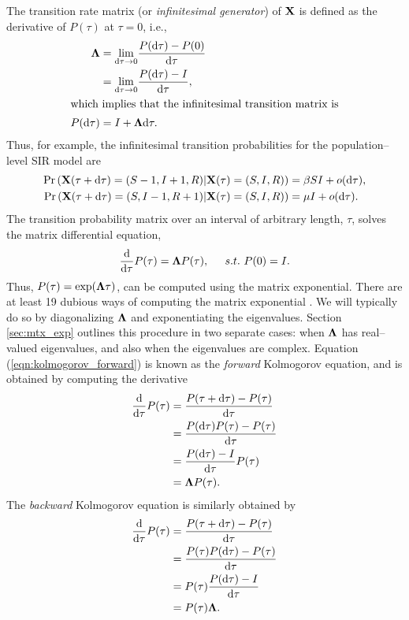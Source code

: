 The transition rate matrix (or \textit{infinitesimal generator}) of $ \mathbf{X} $ is defined as the derivative of $ P(\tau) $ at $ \tau = 0 $, i.e.,
\begin{align*}
\label{eqn:ctmc_generator}
\boldsymbol{\Lambda} &= \underset{\mathrm{d}\tau \rightarrow 0}{\lim}\frac{P(\mathrm{d}\tau) - P(0)}{\mathrm{d}\tau} \\
&= \underset{\mathrm{d}\tau \rightarrow 0}{\lim}\frac{P(\mathrm{d}\tau) - I}{\mathrm{d}\tau}, \\
\shortintertext{which implies that the infinitesimal transition matrix is} P(\mathrm{d}\tau) &= I + \boldsymbol{\Lambda}\mathrm{d}\tau.
\end{align*}
Thus, for example, the infinitesimal transition probabilities for the population--level SIR model are
\begin{align*}
\Pr\left (\mathbf{X}(\tau+\mathrm{d}\tau) = (S-1, I+1, R) | \mathbf{X}(\tau) = (S,I,R)\right ) &= \beta SI + o(\mathrm{d}\tau), \\
\Pr\left (\mathbf{X}(\tau+\mathrm{d}\tau) = (S, I-1, R+1) | \mathbf{X}(\tau) = (S,I,R)\right ) &= \mu I + o(\mathrm{d}\tau).
\end{align*}
The transition probability matrix over an interval of arbitrary length, $ \tau $, solves the matrix differential equation,  \begin{equation}\label{eqn:kolmogorov_forward}
\frac{\mathrm{d}}{\mathrm{d}\tau}P(\tau) = \boldsymbol{\Lambda} P(\tau),\hspace{0.2in} s.t.\  P(0) = I.
\end{equation} 
Thus, $ P(\tau) = \exp(\boldsymbol{\Lambda}\tau) $, can be computed using the matrix exponential. There are at least 19 dubious ways of computing the matrix exponential \cite{moler2003nineteen}. We will typically do so by diagonalizing $ \boldsymbol{\Lambda} $ and exponentiating the eigenvalues. Section \ref{sec:mtx_exp} outlines this procedure in two separate cases: when $ \boldsymbol{\Lambda}$ has real--valued eigenvalues, and also when the eigenvalues are complex. Equation (\ref{eqn:kolmogorov_forward}) is known as the \textit{forward} Kolmogorov equation, and is obtained by computing the derivative
\begin{align*}
\frac{\mathrm{d}}{\mathrm{d}\tau}P(\tau) &= \frac{P(\tau + \mathrm{d}\tau) - P(\tau)}{\mathrm{d}\tau} \\
&= \frac{P(\mathrm{d}\tau)P(\tau) - P(\tau)}{\mathrm{d}\tau} \\
&= \frac{P(\mathrm{d}\tau) - I}{\mathrm{d}\tau}P(\tau)\\
&= \boldsymbol{\Lambda} P(\tau).
\end{align*}
The \textit{backward} Kolmogorov equation is similarly obtained by
\begin{align}
\frac{\mathrm{d}}{\mathrm{d}\tau}P(\tau) &= \frac{P(\tau + \mathrm{d}\tau) - P(\tau)}{\mathrm{d}\tau} \nonumber \\
&= \frac{P(\tau)P(\mathrm{d}\tau) - P(\tau)}{\mathrm{d}\tau} \nonumber \\
&= P(\tau)\frac{P(\mathrm{d}\tau) - I}{\mathrm{d}\tau}\nonumber\\
&= P(\tau)\boldsymbol{\Lambda} .
\end{align}

